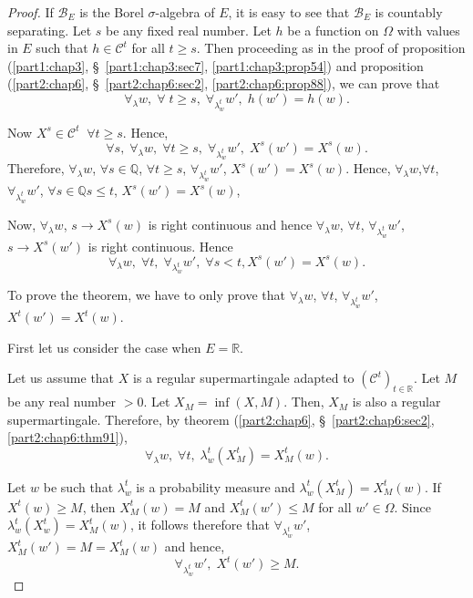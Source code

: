 \begin{proof}
If $\mathscr{B}_E$ is the Borel $\sigma$-algebra of $E$, it is easy to
see that $\mathscr{B}_E$ is countably separating. Let $s$ be any fixed
real number. Let $h$ be a function on $\Omega$ with values in $E$ such
that $h \in \mathscr{C}^t$ for all $t \geq s$. Then proceeding as in
the proof of proposition (\ref{part1:chap3},
\S\ \ref{part1:chap3:sec7}, \ref{part1:chap3:prop54}) and proposition
(\ref{part2:chap6}, \S\ \ref{part2:chap6:sec2},
\ref{part2:chap6:prop88}), we can prove that  
$$
\forall_\lambda w, \; \forall \; t \geq s, \; \forall_{\lambda^t_w}
w', \; h(w') = h(w).
$$

Now $X^s \in \mathscr{C}^t \;\; \forall t \geq s$. Hence,
$$
\forall s, \; \forall_\lambda w, \; \forall t \geq s , \; \forall
_{\lambda^t_w} w', \; X^s(w') = X^s(w). 
$$
Therefore, $\forall_\lambda w$, $\forall s \in \mathbb{Q}$, $\forall t
\geq s$, $\forall_{\lambda^t_w} w'$, $X^s(w') = X^s(w)$. Hence, 
$\forall_\lambda w$,\pageoriginale $\forall t$, $\forall_{\lambda^t_w}
w'$, $\forall s \in \mathbb{Q} s \leq t$, $X^s (w') = X^s (w)$, 

Now, $\forall_\lambda w$, $s \to X^s(w)$ is right continuous and hence
$\forall_\lambda w$, $\forall t$, $\forall_{\lambda^t_w} w'$, $s \to
X^s(w')$ is right continuous. Hence
\begin{equation*}
\forall_\lambda w, \; \forall t, \; \forall_{\lambda^t_w} w', \;
\forall s < t, X^s (w') = X^s(w). \tag{1}\label{part2:chap6:eq1}
\end{equation*}

To prove the theorem, we have to only prove that $\forall_\lambda w$,
$\forall t$, $\forall_{\lambda^t_w} w'$,  $X^t(w') = X^t(w)$. 

First let us consider the case when $E = \mathbb{R}$. 

Let us assume that $X$ is a regular supermartingale adapted to
$(\mathscr{C}^t)_{t \in\mathbb{R}}$. Let $M$ be any real number
$>0$. Let $X_M = \inf (X, M)$. 
 Then, $X_M$ is also a regular supermartingale. Therefore, by theorem
 (\ref{part2:chap6}, \S\ \ref{part2:chap6:sec2},
 \ref{part2:chap6:thm91}),
$$
\forall_\lambda w, \; \forall t, \; \lambda^t_w(X^t_M) = X^t_M(w).
$$

Let $w$ be such that $\lambda^t_w$ is a probability measure and
$\lambda^t_w(X^t_M) = X^t_M (w)$. If $X^t (w) \geq M$, then $X^t_M(w)
= M$ and $X^t_M(w') \leq M$ for all $w' \in \Omega$. Since
$\lambda^t_w(X^t_w) = X^t_M(w)$, it follows therefore that
$\forall_{\lambda^t_w} w'$,  $X^t_M (w') = M = X^t_M(w)$ and hence, 
$$
\forall_{\lambda^t_w} w', \; X^t(w') \geq M.
$$


\end{proof}
